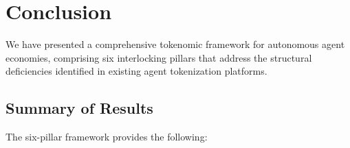 \section{Conclusion}
\label{sec:conclusion}

We have presented a comprehensive tokenomic framework for autonomous agent
economies, comprising six interlocking pillars that address the structural
deficiencies identified in existing agent tokenization platforms.

\subsection{Summary of Results}
\label{subsec:summary}

The six-pillar framework provides the following:

